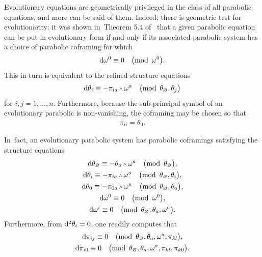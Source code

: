 \documentclass[pdftex]{sigma}
\renewcommand{\d}{{\rm d}}
\renewcommand{\mod}[1]{\quad\big(\mathrm{mod\enspace} #1\big)}
\newcommand{\w}{{\mathchoice{\,{\scriptstyle\wedge}\,}{{\scriptstyle\wedge}}
 {{\scriptscriptstyle\wedge}}{{\scriptscriptstyle\wedge}}}}
\newcommand{\thetas}[1]{\theta_{#1}}
\newcommand{\pis}[1]{\pi_{#1}}
\numberwithin{equation}{section}
\begin{document}
Evolutionary equations are geometrically privileged in the class of all parabolic equations, and more can be said of them.
Indeed, there is geometric test for evolutionarity: it was shown in~Theorem 5.4 of~\cite{McMillan:ParabolicsI} that
a given parabolic equation can be put in evolutionary form if and only if its associated parabolic system has a choice of parabolic coframing for which
\begin{gather*}
\d \omega^0 \equiv 0 \mod{\omega^0} .
\end{gather*}
This in turn is equivalent to the refined structure equations
\begin{gather}\label{eq:refined evolutionary structure equations}
 \d\thetas{i} \equiv -\pis{ia}\w\omega^a \mod{ \thetas{\varnothing},\thetas{j} }
\end{gather}
for $i, j = 1 , \dots , n$.
Furthermore, because the sub-principal symbol of an evolutionary parabolic is non-vanishing, the coframing may be chosen so that
\begin{gather}\label{eq:evolutionary parabolic sub-principal symbol}
 \pis{ii} = \thetas{0} .
\end{gather}

In~fact, an evolutionary parabolic system has parabolic coframings satisfying the structure equations
\begin{gather*}%
 \d\thetas{\varnothing} \equiv - \thetas{a}\w\omega^a \mod{\thetas{\varnothing} }, \\
 \d\thetas{i} \equiv - \pis{ia}\w\omega^a \mod{ \thetas{\varnothing}, \thetas{i} }, \\
 \d\thetas{0} \equiv - \pis{0a}\w\omega^a \mod{ \thetas{\varnothing}, \thetas{a} }, \\
 \d\omega^0 \equiv 0 \mod{\omega^0 }, \\
 \d\omega^i \equiv 0 \mod{\thetas{\varnothing}, \thetas{a}, \omega^a } .
\end{gather*}
Furthermore, from $\d^2 \thetas{i} = 0$, one readily computes that
\begin{gather*}%
 \d\pis{ij} \equiv 0 \mod{ \thetas{\varnothing}, \thetas{a}, \omega^a, \pis{kl} },
 \\
 \d\pis{i0} \equiv 0 \mod{ \thetas{\varnothing}, \thetas{a}, \omega^a, \pis{kl}, \pis{k0} } .
\end{gather*}
\end{document}

